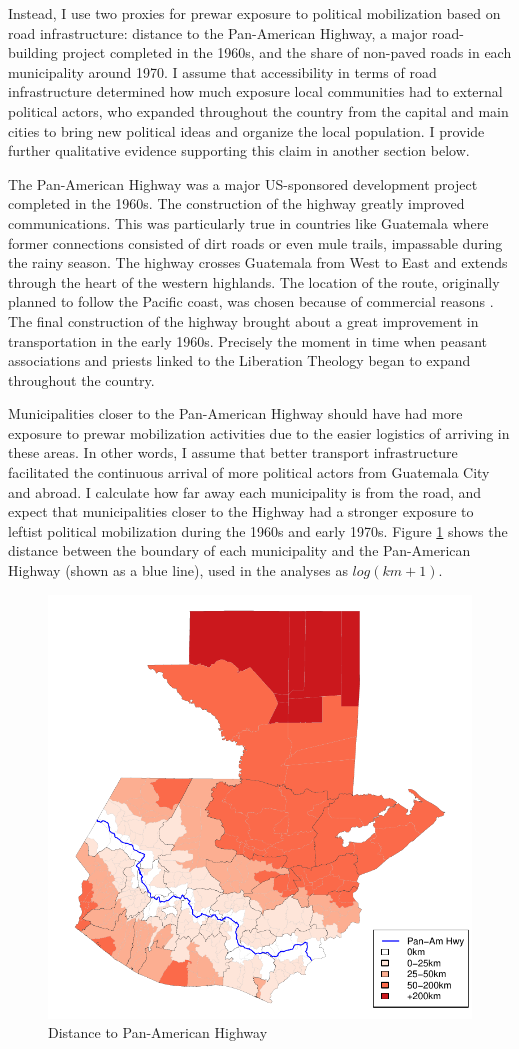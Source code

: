 \documentclass[12pt, notitlepage]{article}
\begin{document}
Instead, I use two proxies for prewar exposure to political mobilization based on road infrastructure: distance to the Pan-American Highway, a major road-building project completed in the 1960s, and the share of non-paved roads in each municipality around 1970.
I assume that accessibility in terms of road infrastructure determined how much exposure local communities had to external political actors, who expanded throughout the country from the capital and main cities to bring new political ideas and organize the local population.
I provide further qualitative evidence supporting this claim in another section below.

The Pan-American Highway was a major US-sponsored development project completed in the 1960s.
The construction of the highway greatly improved communications.
This was particularly true in countries like Guatemala where former connections consisted of dirt roads or even mule trails, impassable during the rainy season.
The highway crosses Guatemala from West to East and extends through the heart of the western highlands.
The location of the route, originally planned to follow the Pacific coast, was chosen because of commercial reasons \citep{Rutkow:2019aa}.
The final construction of the highway brought about a great improvement in transportation in the early 1960s.
Precisely the moment in time when peasant associations and priests linked to the Liberation Theology began to expand throughout the country.

Municipalities closer to the Pan-American Highway should have had more exposure to prewar mobilization activities due to the easier logistics of arriving in these areas.
In other words, I assume that better transport infrastructure facilitated the continuous arrival of more political actors from Guatemala City and abroad.
I calculate how far away each municipality is from the road, and expect that municipalities closer to the Highway had a stronger exposure to leftist political mobilization during the 1960s and early 1970s.
Figure \ref{fig:map_panam} shows the distance between the boundary of each municipality and the Pan-American Highway (shown as a blue line), used in the analyses as $log(km + 1)$.

\begin{figure}[htb!]
  \centering
    \includegraphics[width = .4\textwidth]{img/map_panam}

  \caption{Distance to Pan-American Highway} \label{fig:map_panam}

\end{figure}
\end{document}
